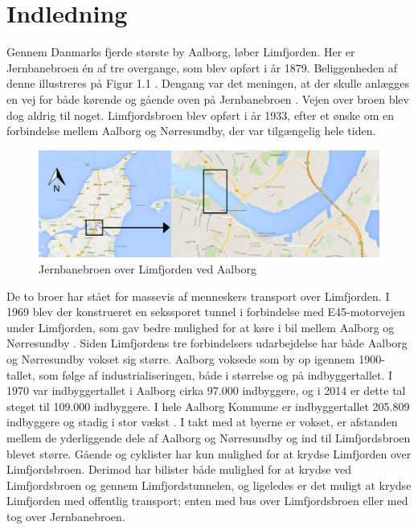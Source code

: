 \chapter{Indledning}
Gennem Danmarks fjerde største by Aalborg, løber Limfjorden. Her er Jernbanebroen én af tre overgange, som blev opført i år 1879. Beliggenheden af denne illustreres på Figur 1.1 \citep{redaktionen}. Dengang var det meningen, at der skulle anlægges en vej for både kørende og gående oven på Jernbanebroen \citep{Johannesen}. Vejen over broen blev dog aldrig til noget. Limfjordsbroen blev opført i år 1933, efter et ønske om en forbindelse mellem Aalborg og Nørresundby, der var tilgængelig hele tiden. 
\begin{figure}[htbp]
	\centering
	\includegraphics[width=1.0\textwidth]{billeder/indledning1.png}
	\caption{Jernbanebroen over Limfjorden ved Aalborg}
	\label{fig:billede1}
\end{figure}
\newline
De to broer har stået for massevis af menneskers transport over Limfjorden. I 1969 blev der konstrueret en sekssporet tunnel i forbindelse med E45-motorvejen under Limfjorden, som gav bedre mulighed for at køre i bil mellem Aalborg og Nørresundby \citep{DenStoreDanske4} \citep{Vejdirektoratet}.
\newline \indent{     }  Siden Limfjordens tre forbindelsers udarbejdelse har både Aalborg og Nørresundby vokset sig større. Aalborg voksede som by op igennem 1900-tallet, som følge af industrialiseringen, både i størrelse og på indbyggertallet. I 1970 var indbyggertallet i Aalborg cirka 97.000 indbyggere, og i 2014 er dette tal steget til 109.000 indbyggere. I hele Aalborg Kommune er indbyggertallet 205.809 indbyggere og stadig i stor vækst \citep{DenStoreDanske2} \citep{statistik}.
\newline \indent{     }  I takt med at byerne er vokset, er afstanden mellem de yderliggende dele af Aalborg og Nørresundby og ind til Limfjordsbroen blevet større. Gående og cyklister har kun mulighed for at krydse Limfjorden over Limfjordsbroen. Derimod har bilister både mulighed for at krydse ved Limfjordsbroen og gennem Limfjordstunnelen, og ligeledes er det muligt at krydse Limfjorden med offentlig transport; enten med bus over Limfjordsbroen eller med tog over Jernbanebroen.
